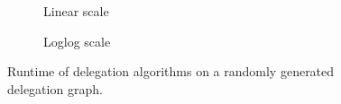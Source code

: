 \begin{figure}[h]
    \centering
    \begin{subfigure}[t]{0.45\textwidth}
        \centering
        \caption{Linear scale}
        \label{subfig:small_world_graph_linl}
    \end{subfigure}
    \hfill
    \begin{subfigure}[t]{0.45\textwidth}
        \centering
        \caption{Loglog scale}
        \label{subfig:small_world_graph_loglog}
    \end{subfigure}
    \caption{Runtime of delegation algorithms on a randomly generated delegation graph.}
    \label{fig:small_world_graph}
\end{figure}

